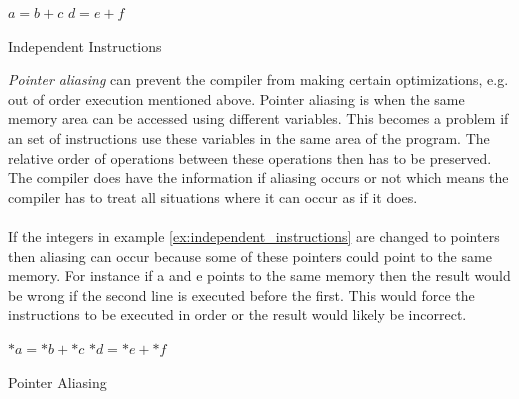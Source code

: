 \documentclass[10pt,a4paper]{report}
\newcounter{ExamplesCounter}
\begin{document}
\begin{algorithm}
\DontPrintSemicolon
\SetStartEndCondition{ (}{)}{)}\SetAlgoBlockMarkers{\{}{\}}%
%
%
%
%
%
\AlgoDisplayBlockMarkers\SetAlgoNoLine%


\BlankLine \BlankLine


\BlankLine \BlankLine
$a = b + c$\;
$d = e + f$\;

\caption{Independent Instructions}
\label{ex:independent_instructions}
\end{algorithm}

\emph{Pointer aliasing} can prevent the compiler from making certain optimizations, e.g. out of order execution mentioned above. Pointer aliasing is when the same memory area can be accessed using different variables\cite{introduction_hpc_hager}. This becomes a problem if an set of instructions use these variables in the same area of the program. The relative order of operations between these operations then has to be preserved. The compiler does have the information if aliasing occurs or not which means the compiler has to treat all situations where it can occur as if it does\cite{introduction_hpc_hager}.\\
\\
If the integers in example \ref{ex:independent_instructions} are changed to pointers then aliasing can occur because some of these pointers could point to the same memory. For instance if a and e points to the same memory then the result would be wrong if the second line is executed before the first. This would force the instructions to be executed in order or the result would likely be incorrect.

\begin{algorithm}
\DontPrintSemicolon
\SetStartEndCondition{ (}{)}{)}\SetAlgoBlockMarkers{\{}{\}}%
%
%
%
%
%
\AlgoDisplayBlockMarkers\SetAlgoNoLine%


\BlankLine \BlankLine


\BlankLine \BlankLine
$*a = *b + *c$\;
$*d = *e + *f$\;

\caption{Pointer Aliasing}
\label{ex:pointer_aliasing}
\end{algorithm}
\end{document}
